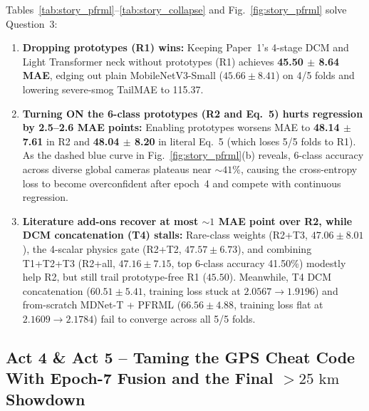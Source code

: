 \documentclass[conference]{IEEEtran}
\begin{document}
Tables~\ref{tab:story_pfrml}--\ref{tab:story_collapse} and
Fig.~\ref{fig:story_pfrml} solve Question~3:
\begin{enumerate}
  \item \textbf{Dropping prototypes (R1) wins:} Keeping Paper~1's 4-stage DCM
        and Light Transformer neck without prototypes (R1) achieves
        \textbf{45.50 $\pm$ 8.64 MAE}, edging out plain MobileNetV3-Small
        ($45.66 \pm 8.41$) on 4/5 folds and lowering severe-smog TailMAE to
        115.37.
  \item \textbf{Turning ON the 6-class prototypes (R2 and Eq.~5) hurts
        regression by 2.5--2.6 MAE points:} Enabling prototypes worsens MAE to
        \textbf{48.14 $\pm$ 7.61} in R2 and \textbf{48.04 $\pm$ 8.20} in literal
        Eq.~5 (which loses 5/5 folds to R1). As the dashed blue curve in
        Fig.~\ref{fig:story_pfrml}(b) reveals, 6-class accuracy across diverse
        global cameras plateaus near $\sim 41\%$, causing the cross-entropy loss
        to become overconfident after epoch~4 and compete with continuous
        regression.
  \item \textbf{Literature add-ons recover at most $\sim 1$ MAE point over R2,
        while DCM concatenation (T4) stalls:} Rare-class weights (R2+T3,
        $47.06 \pm 8.01$), the 4-scalar physics gate (R2+T2, $47.57 \pm 6.73$),
        and combining T1+T2+T3 (R2+all, $47.16 \pm 7.15$, top 6-class accuracy
        41.50\%) modestly help R2, but still trail prototype-free R1 ($45.50$).
        Meanwhile, T4 DCM concatenation ($60.51 \pm 5.41$, training loss stuck
        at $2.0567 \to 1.9196$) and from-scratch MDNet-T + PFRML
        ($66.56 \pm 4.88$, training loss flat at $2.1609 \to 2.1784$) fail to
        converge across all 5/5 folds.
\end{enumerate}

\subsection{
  Act 4 \& Act 5 -- Taming the GPS Cheat Code With Epoch-7 Fusion and the Final
  $> 25\text{ km}$ Showdown
}
\label{subsec:act4_5_fusion_test}
\end{document}
